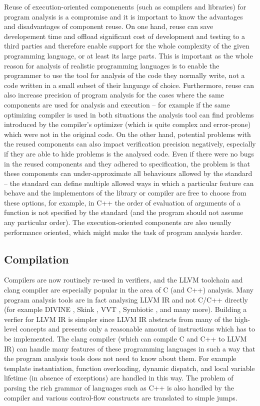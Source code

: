 Reuse of execution-oriented componenents (such as compilers and libraries) for
program analysis is a compromise and it is important to know the advantages and
disadvantages of component reuse.
On one hand, reuse can save developement time and offload significant cost
of development and testing to a third parties and therefore enable support for the whole complexity of the given programming language, or at least its large parts.
This is important as the whole reason for analysis of realistic programming languages is to enable the programmer to use the tool for analysis of the code they normally write, not a code written in a small subset of their language of choice.
Furthermore, reuse can also increase precision of program analysis for the cases where the same components are used for analysis and execution -- for example if the same optimizing compiler is used in both situations the analysis tool can find problems introduced by the compiler's optimizer (which is quite complex and error-prone) which were not in the original code.
On the other hand, potential problems with the reused components can also
impact verification precision negatively, especially if they are able to hide
problems is the analysed code.
Even if there were no bugs in the reused components and they adhered to specification, the problem is that these components can under-approximate all behaviours allowed by the standard -- the standard can define multiple allowed ways in which a particular feature can behave and the implementors of the library or compiler are free to choose from these options, for example, in C++ the order of evaluation of arguments of a function is not specified by the standard (and the program should not assume any particular order).
The execution-oriented components are also usually performance oriented, which might make the task of program analysis harder.

\subsection{Compilation}

Compilers are now routinely re-used in verifiers, and the LLVM toolchain and clang compiler are especially popular in the area of C (and C++) analysis.
Many program analysis tools are in fact analysing LLVM IR and not C/C++ directly (for example DIVINE , Skink , VVT , Symbiotic , and many more).
Building a verfier for LLVM IR is simpler since LLVM IR abstracts from many of
the high-level concepts and presents only a reasonable amount of instructions
which has to be implemented.
The clang compiler (which can compile C and C++ to LLVM IR) can handle many
features of these programming languages in such a way that the program analysis
tools does not need to know about them.
For example template instantiation, function overloading, dynamic dispatch, and
local variable lifetime (in absence of exceptions) are handled in this way.
The problem of parsing the rich grammar of languages such as C++ is
also handled by the compiler and various control-flow constructs are translated
to simple jumps.

